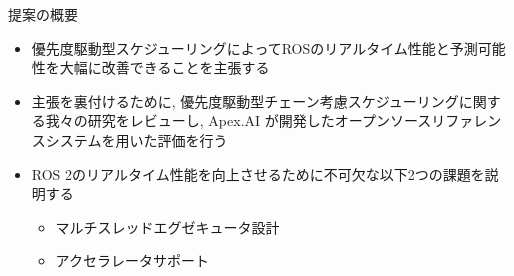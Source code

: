 

\begin{frame}{提案の概要}
    \begin{itemize}
        \item 優先度駆動型スケジューリングによってROSのリアルタイム性能と予測可能性を大幅に改善できることを主張する
        \item 主張を裏付けるために, 優先度駆動型チェーン考慮スケジューリングに関する我々の研究をレビューし, Apex.AI が開発したオープンソースリファレンスシステムを用いた評価を行う
        \item ROS 2のリアルタイム性能を向上させるために不可欠な以下2つの課題を説明する
        \begin{itemize}
            \item マルチスレッドエグゼキュータ設計
            \item アクセラレータサポート
        \end{itemize}
    \end{itemize}
\end{frame}

